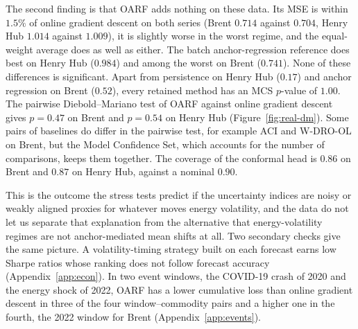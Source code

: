 \documentclass[12pt]{article}
\theoremstyle{plain}
\theoremstyle{remark}
\newcommand{\OARF}{\textsc{OARF}}
\begin{document}
The second finding is that \OARF{} adds nothing on these data. Its MSE is within $1.5\%$
of online gradient descent on both series (Brent $0.714$ against $0.704$, Henry Hub
$1.014$ against $1.009$), it is slightly worse in the worst regime, and the
equal-weight average does as well as either. The batch anchor-regression reference does
best on Henry Hub ($0.984$) and among the worst on Brent ($0.741$). None of these
differences is significant. Apart from persistence on Henry Hub ($0.17$) and anchor
regression on Brent ($0.52$), every retained method has an MCS $p$-value of $1.00$. The
pairwise Diebold--Mariano test of \OARF{} against online gradient descent gives
$p=0.47$ on Brent and $p=0.54$ on Henry Hub (Figure~\ref{fig:real-dm}). Some pairs of
baselines do differ in the pairwise test, for example ACI and W-DRO-OL on Brent, but
the Model Confidence Set, which accounts for the number of comparisons, keeps them
together. The coverage of the conformal head is $0.86$ on Brent
and $0.87$ on Henry Hub, against a nominal $0.90$.

This is the outcome the stress tests predict if the uncertainty indices are noisy or
weakly aligned proxies for whatever moves energy volatility, and the data do not let us
separate that explanation from the alternative that energy-volatility regimes are not
anchor-mediated mean shifts at all. Two secondary checks give the same picture. A
volatility-timing strategy built on each forecast earns low Sharpe ratios whose ranking
does not follow forecast accuracy (Appendix~\ref{app:econ}). In two event windows,
the COVID-19 crash of 2020 and the energy shock of 2022, \OARF{} has a lower
cumulative loss than online gradient descent in three of the four window--commodity
pairs and a higher one in the fourth, the 2022 window for Brent
(Appendix~\ref{app:events}).
\end{document}
